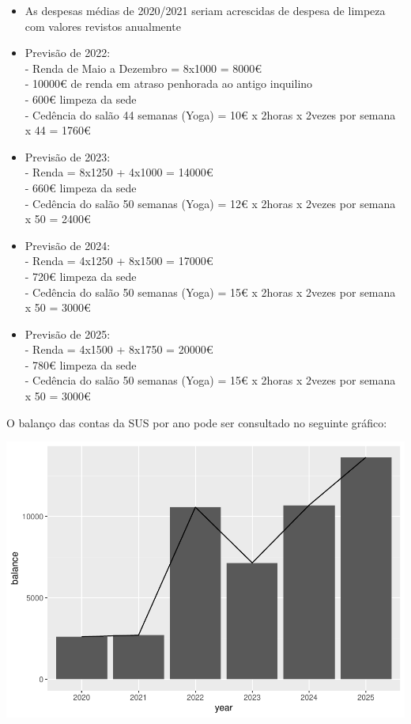 \documentclass[
]{article}
\begin{document}
\begin{itemize}
\item
  As despesas médias de 2020/2021 seriam acrescidas de despesa de
  limpeza com valores revistos anualmente
\item
  Previsão de 2022:\\
  - Renda de Maio a Dezembro = 8x1000 = 8000€\\
  - 10000€ de renda em atraso penhorada ao antigo inquilino\\
  - 600€ limpeza da sede\\
  - Cedência do salão 44 semanas (Yoga) = 10€ x 2horas x 2vezes por
  semana x 44 = 1760€
\item
  Previsão de 2023:\\
  - Renda = 8x1250 + 4x1000 = 14000€\\
  - 660€ limpeza da sede\\
  - Cedência do salão 50 semanas (Yoga) = 12€ x 2horas x 2vezes por
  semana x 50 = 2400€
\item
  Previsão de 2024:\\
  - Renda = 4x1250 + 8x1500 = 17000€\\
  - 720€ limpeza da sede\\
  - Cedência do salão 50 semanas (Yoga) = 15€ x 2horas x 2vezes por
  semana x 50 = 3000€
\item
  Previsão de 2025:\\
  - Renda = 4x1500 + 8x1750 = 20000€\\
  - 780€ limpeza da sede\\
  - Cedência do salão 50 semanas (Yoga) = 15€ x 2horas x 2vezes por
  semana x 50 = 3000€
\end{itemize}

O balanço das contas da SUS por ano pode ser consultado no seguinte
gráfico:

\includegraphics{PE_files/figure-latex/incomeGraph-1.pdf}
\end{document}
